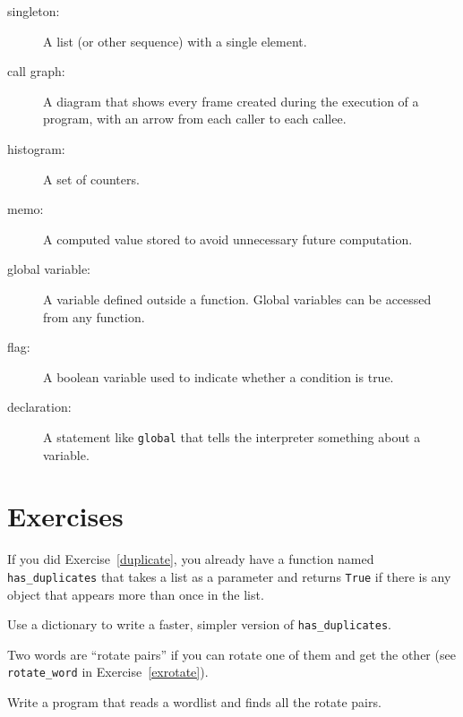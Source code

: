 \documentclass[10pt]{book}
\begin{document}
\begin{description}
\item[singleton:] A list (or other sequence) with a single element.

\item[call graph:] A diagram that shows every frame created during
the execution of a program, with an arrow from each caller to
each callee. 

\item[histogram:] A set of counters.

\item[memo:] A computed value stored to avoid unnecessary future 
computation.

\item[global variable:]  A variable defined outside a function.  Global
variables can be accessed from any function.

\item[flag:] A boolean variable used to indicate whether a condition
is true.

\item[declaration:] A statement like {\tt global} that tells the
interpreter something about a variable.

\end{description}

\section{Exercises}

\begin{ex}

If you did Exercise~\ref{duplicate}, you already have
a function named \verb"has_duplicates" that takes a list
as a parameter and returns {\tt True} if there is any object
that appears more than once in the list.

Use a dictionary to write a faster, simpler version of
\verb"has_duplicates".
\end{ex}


\begin{ex}
\label{exrotatepairs}


Two words are ``rotate pairs'' if you can rotate one of them
and get the other (see \verb"rotate_word" in Exercise~\ref{exrotate}).

Write a program that reads a wordlist and finds all the rotate
pairs.
\end{ex}
\end{document}
